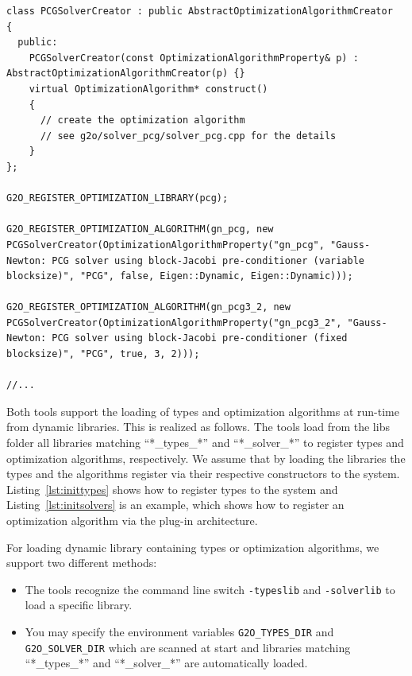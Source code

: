 \documentclass[a4paper]{article}
\begin{document}
\begin{lstlisting}[float,label=lst:initsolvers,caption=Registering
  solvers by a constructor from a library]
class PCGSolverCreator : public AbstractOptimizationAlgorithmCreator
{
  public:
    PCGSolverCreator(const OptimizationAlgorithmProperty& p) : AbstractOptimizationAlgorithmCreator(p) {}
    virtual OptimizationAlgorithm* construct()
    {
      // create the optimization algorithm
      // see g2o/solver_pcg/solver_pcg.cpp for the details
    }
};

G2O_REGISTER_OPTIMIZATION_LIBRARY(pcg);

G2O_REGISTER_OPTIMIZATION_ALGORITHM(gn_pcg, new PCGSolverCreator(OptimizationAlgorithmProperty("gn_pcg", "Gauss-Newton: PCG solver using block-Jacobi pre-conditioner (variable blocksize)", "PCG", false, Eigen::Dynamic, Eigen::Dynamic)));

G2O_REGISTER_OPTIMIZATION_ALGORITHM(gn_pcg3_2, new PCGSolverCreator(OptimizationAlgorithmProperty("gn_pcg3_2", "Gauss-Newton: PCG solver using block-Jacobi pre-conditioner (fixed blocksize)", "PCG", true, 3, 2)));

//...
\end{lstlisting}

Both tools support the loading of types and optimization algorithms at
run-time from dynamic libraries. This is realized as follows. The tools
load from the libs folder all libraries matching ``*\_types\_*'' and
``*\_solver\_*'' to register types and optimization algorithms,
respectively. We assume that by loading the libraries the types and the
algorithms register via their respective constructors to the system.
Listing~\ref{lst:inittypes} shows how to register types to the system
and Listing~\ref{lst:initsolvers} is an example, which shows how to
register an optimization algorithm via the plug-in architecture.

For loading dynamic library containing types or optimization algorithms, we support two
different methods:
\begin{itemize}
  \item The tools recognize the command line switch \verb+-typeslib+
    and \verb+-solverlib+ to load a specific library.
  \item You may specify the environment variables \verb+G2O_TYPES_DIR+
    and \verb+G2O_SOLVER_DIR+ which are scanned at start and libraries
    matching ``*\_types\_*'' and ``*\_solver\_*'' are automatically
    loaded.
\end{itemize}
\end{document}
